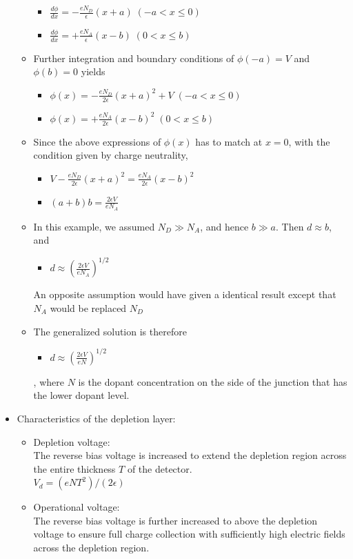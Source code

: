 \begin{itemize}
\begin{itemize}
\begin{itemize}
            \item[] $\frac{d\phi}{dx}=-\frac{eN_D}{\epsilon}(x+a)\;(-a<x\leq0)$
            \item[] $\frac{d\phi}{dx}=+\frac{eN_A}{\epsilon}(x-b)\;(0<x\leq b)$
        \end{itemize}
        \item Further integration and boundary conditions of $\phi(-a)=V$ and $\phi(b)=0$ yields
        \begin{itemize}
            \item[] $\phi(x)=-\frac{eN_D}{2\epsilon}(x+a)^2+V\;(-a<x\leq0)$
            \item[] $\phi(x)=+\frac{eN_A}{2\epsilon}(x-b)^2\;(0<x\leq b)$
        \end{itemize}
        \item Since the above expressions of $\phi(x)$ has to match at $x=0$, with the condition given by charge neutrality,  
        \begin{itemize}
            \item[] $V-\frac{eN_D}{2\epsilon}(x+a)^2=\frac{eN_A}{2\epsilon}(x-b)^2$
            \item[] $(a+b)b=\frac{2\epsilon V}{eN_A}$
        \end{itemize}
        \item In this example, we assumed $N_D\gg N_A$, and hence $b\gg a$. Then $d\approx b$, and 
        \begin{itemize}
            \item[] $d\approx\left(\frac{2\epsilon V}{eN_A}\right)^{1/2}$
        \end{itemize}
        An opposite assumption would have given a identical result except that $N_A$ would be replaced $N_D$
        \item The generalized solution is therefore 
        \begin{itemize}
            \item[] $d\approx\left(\frac{2\epsilon V}{eN}\right)^{1/2}$
        \end{itemize}
        , where $N$ is the dopant concentration on the side of the junction that has the lower dopant level.
    \end{itemize}
    \item Characteristics of the depletion layer:
    \begin{itemize}
        \item Depletion voltage:\\
        The reverse bias voltage is increased to extend the depletion region across the entire thickness $T$ of the detector.\\
        $V_d={(eNT^2)}/{(2\epsilon)}$
        \item Operational voltage:\\
        The reverse bias voltage is further increased to above the depletion voltage to ensure full charge collection with sufficiently high electric fields across the depletion region.
    \end{itemize}
\end{itemize}
